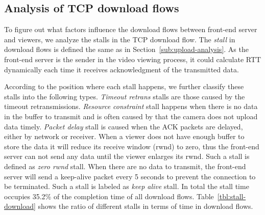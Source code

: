 \subsection{Analysis of TCP download flows}
\label{sub:download-analysis}

To figure out what factors influence the download flows between front-end server and viewers, we analyze the stalls in the TCP download flow. The \emph{stall} in download flows is defined the same as in Section~\ref{sub:upload-analysis}. As the front-end server is the sender in the video viewing process, it could calculate RTT dynamically each time it receives acknowledgment of the transmitted data.

According to the position where each stall happens, we further classify these stalls into the following types. \emph{Timeout retrans} stalls are those caused by the timeout retransmissions. \emph{Resource constraint} stall happens when there is no data in the buffer to transmit and is often caused by that the camera does not upload data timely.%
\emph{Packet delay} stall is caused when the ACK packets are delayed, either by network or receiver. When a viewer does not have enough buffer to store the data it will reduce its receive window (rwnd) to zero, thus the front-end server can not send any data until the viewer enlarges its rwnd. Such a stall is defined as \emph{zero rwnd} stall. When there are no data to transmit, the front-end server will send a keep-alive packet every 5 seconds to prevent the connection to be terminated. Such a stall is labeled as \emph{keep alive} stall. In total the stall time occupies 35.2\% of the completion time of all download flows. Table~\ref{tbl:stall-download} shows the ratio of different stalls in terms of time in download flows.

